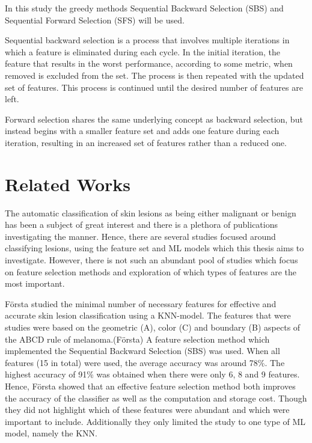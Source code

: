 \documentclass{kththesis}
\begin{document}
In this study the greedy methods Sequential Backward Selection (SBS) and Sequential Forward Selection (SFS) will be used.

Sequential backward selection is a process that involves multiple iterations in which a feature is eliminated during each cycle. In the initial iteration, the feature that results in the worst performance, according to some metric, when removed is excluded from the set. The process is then repeated with the updated set of features. This process is continued until the desired number of features are left. %

Forward selection shares the same underlying concept as backward selection, but instead begins with a smaller feature set and adds one feature during each iteration, resulting in an increased set of features rather than a reduced one.


\section{Related Works}


The automatic classification of skin lesions as being either malignant or benign has been a subject of great interest and there is a plethora of publications investigating the manner. Hence, there are several studies focused around classifying lesions, using the feature set and ML models which this thesis aims to investigate. However, there is not such an abundant pool of studies which focus on feature selection methods and exploration of which types of features are the most important. 

Första studied the minimal number of necessary features for effective and accurate skin lesion classification using a KNN-model.  The features that were studies were based on the geometric (A), color (C)  and boundary (B) aspects of the ABCD rule of melanoma.(Första) A feature selection method which implemented the Sequential Backward Selection (SBS) was used. When all features (15 in total) were used, the average accuracy was around 78\%. The highest accuracy of 91\% was obtained when there were only 6, 8 and 9 features. Hence, Första showed that an effective feature selection method both improves the accuracy of the classifier as well as the computation and storage cost. Though they did not highlight which of these features were abundant and which were important to include. Additionally they only limited the study to one type of ML model, namely the KNN. 
\end{document}
